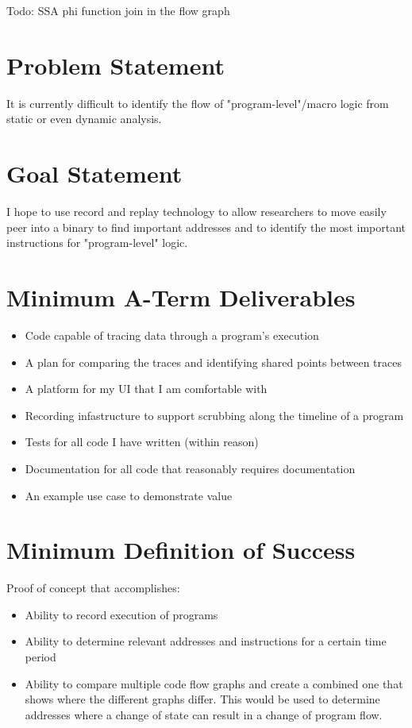 \maketitle

Todo:
SSA phi function join in the flow graph

\section{Problem Statement}

It is currently difficult to identify the flow of "program-level"/macro logic from static or even dynamic analysis. 

\section{Goal Statement}

I hope to use record and replay technology to allow researchers to move easily peer into a binary to find important addresses and to identify the most important instructions for "program-level" logic.

\section{Minimum A-Term Deliverables}

\begin{itemize}
    \item Code capable of tracing data through a program's execution 
    \item A plan for comparing the traces and identifying shared points between traces
    \item A platform for my UI that I am comfortable with
    \item Recording infastructure to support scrubbing along the timeline of a program
    \item Tests for all code I have written (within reason)
    \item Documentation for all code that reasonably requires documentation 
    \item An example use case to demonstrate value
\end{itemize}

\section{Minimum Definition of Success}
Proof of concept that accomplishes:
\begin{itemize}
    \item Ability to record execution of programs
    \item Ability to determine relevant addresses and instructions for a certain time period
    \item Ability to compare multiple code flow graphs and create a combined one that shows where the different graphs differ. This would be used to determine addresses where a change of state can result in a change of program flow.
\end{itemize}

